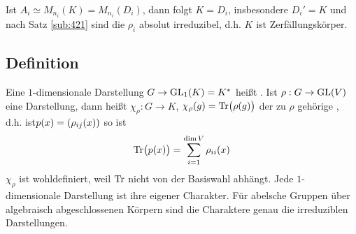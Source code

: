 Ist $A_i \simeq M_{n_i}(K)= M_{n_i}(D_i)$, dann folgt $K=D_i$, insbesondere $D_i'=K$ und nach Satz \ref{sub:421} sind die $\rho_i$ absolut irreduzibel, d.h.
$K$ ist Zerfällungskörper. \bewende

\subsection[Definition: Charakter]{Definition} %
\label{sub:424}
Eine $1$-dimensionale Darstellung $G \to \GL_1(K)=K^*$ heißt . Ist $\rho : G \to \GL(V)$  eine Darstellung, dann heißt $\chi_\rho : G \to K$,
$\chi_\rho(g)= \Tr \enbrace[\big]{\rho(g)}$ der zu $\rho$ gehörige , d.h. ist$p(x)= \enbrace*{\rho_{ij}(x)} $ so ist
\[
	\Tr \enbrace[\big]{ p(x)} = \sum_{i=1}^{\dim V} \rho_{ii} (x)
\]
$\chi_\rho$ ist wohldefiniert, weil $\Tr$ nicht von der Basiswahl abhängt. Jede $1$-dimensionale Darstellung ist ihre eigener Charakter. Für abelsche Gruppen über
algebraisch abgeschlossenen Körpern sind die Charaktere genau die irreduziblen Darstellungen.

